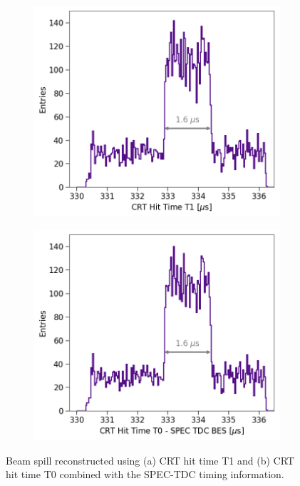 \begin{figure}[b!]
\begin{subfigure}[h]{0.495\linewidth}
\centering    
\includegraphics[width=\linewidth]{CRT_T1_TopHat}
\caption{}
\label{fig:topHat_T1}
\end{subfigure}%
\hfill
\begin{subfigure}[h]{0.495\linewidth}
\centering    
\includegraphics[width=\linewidth]{CRTT0_SPEC_TopHat}
\caption{}
\label{fig:topHat_T0}
\end{subfigure}
\caption[Reconstructed Beam Spill Using CRT Sharps]{
Beam spill reconstructed using (a) CRT hit time T1 and (b) CRT hit time T0 combined with the SPEC-TDC timing information. 
}
\label{fig:topHat}
\end{figure}

